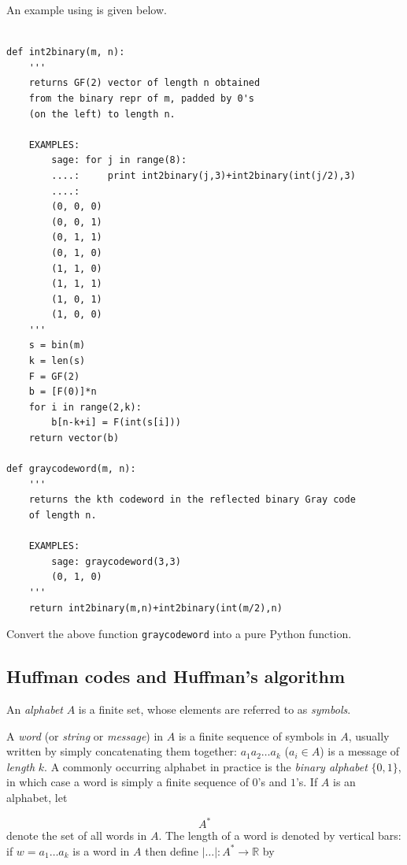 An example using \sage is given below.

\begin{Verbatim}[fontsize=\scriptsize,fontfamily=courier,fontshape=tt,frame=single,label=\sage]

def int2binary(m, n):
    '''
    returns GF(2) vector of length n obtained
    from the binary repr of m, padded by 0's
    (on the left) to length n.

    EXAMPLES:
        sage: for j in range(8):
        ....:     print int2binary(j,3)+int2binary(int(j/2),3)
        ....:
        (0, 0, 0)
        (0, 0, 1)
        (0, 1, 1)
        (0, 1, 0)
        (1, 1, 0)
        (1, 1, 1)
        (1, 0, 1)
        (1, 0, 0)
    '''
    s = bin(m)
    k = len(s)
    F = GF(2)
    b = [F(0)]*n
    for i in range(2,k):
        b[n-k+i] = F(int(s[i]))
    return vector(b)

def graycodeword(m, n):
    '''
    returns the kth codeword in the reflected binary Gray code
    of length n.

    EXAMPLES:
        sage: graycodeword(3,3)
        (0, 1, 0)
    '''
    return int2binary(m,n)+int2binary(int(m/2),n)

\end{Verbatim}

\begin{exercise}
Convert the above function {\tt graycodeword} into a pure Python
function.
\end{exercise}


\subsection{Huffman codes and Huffman's algorithm}


An {\it alphabet} $A$ is a finite set, whose elements are referred to as {\it symbols}.

A {\it word} (or  {\it string} or {\it message}) in $A$ is a finite sequence of symbols in $A$, usually written by simply
concatenating them together: $a_1a_2\dots a_k$ ($a_i\in A$) is a
message of {\it length} $k$.
A commonly occurring alphabet in practice is the {\it binary alphabet}
$\{0,1\}$, in which case a word is simply a finite sequence of $0$'s and $1$'s.
If $A$ is an alphabet, let

\[
A^*
\]
denote the set of all words in $A$.
The length of a word is denoted by vertical bars:
if $w=a_1\dots a_k$ is a word
in $A$ then define $|\dots |:A^*\to {\mathbb{R}}$ by

